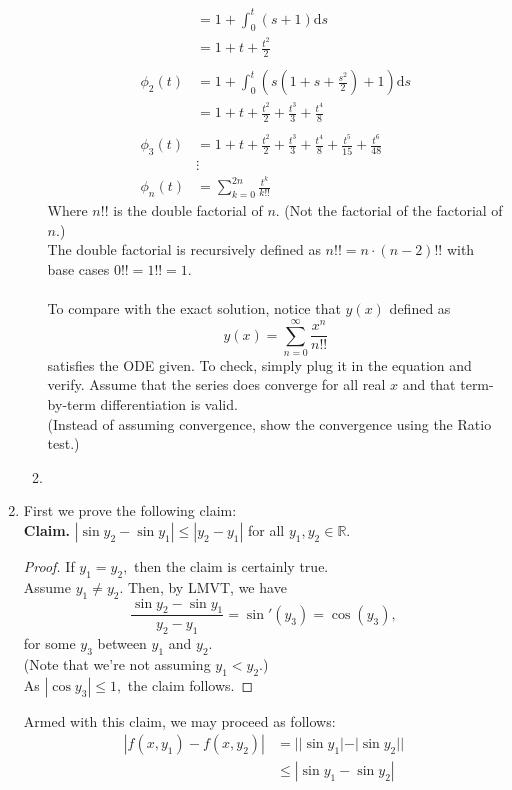 \documentclass{article}
\begin{document}
\begin{enumerate}[label = Q.\arabic*.]
\begin{enumerate}[label = (\roman*)]
\begin{align*}
			&= 1 + \int_{0}^{t} (s + 1) \text{d}s\\
			&= 1 + t + \frac{t^2}{2}\\~\\
			\phi_2(t) &= 1 + \int_{0}^{t} \left(s\left(1 + s + \frac{s^2}{2}\right) + 1\right) \text{d}s\\
			&= 1 + t + \frac{t^2}{2} + \frac{t^3}{3} + \frac{t^4}{8}\\~\\
			\phi_3(t) &= 1 + t + \frac{t^2}{2} + \frac{t^3}{3} + \frac{t^4}{8} + \frac{t^5}{15} + \frac{t^6}{48}\\
			&\vdots\\
			\phi_n(t) &= \sum_{k=0}^{2n}\frac{t^{k}}{k!!}
		\end{align*}
		Where $n!!$ is the double factorial of $n.$ (Not the factorial of the factorial of $n.$)\\
		The double factorial is recursively defined as $n!! = n\cdot(n - 2)!!$ with base cases $0!! = 1!! = 1.$\\~\\
		To compare with the exact solution, notice that $y(x)$ defined as
		\[y(x) = \sum_{n=0}^{\infty}\frac{x^n}{n!!}\]
		satisfies the ODE given. To check, simply plug it in the equation and verify. Assume that the series does converge for all real $x$ and that term-by-term differentiation is valid.\\
		(Instead of assuming convergence, show the convergence using the Ratio test.)
		\item %
	\end{enumerate}
	\item First we prove the following claim:\\
	\textbf{Claim.} $|\sin y_2 - \sin y_1| \le |y_2 - y_1|$ for all $y_1, y_2 \in \mathbb{R}.$
	\begin{proof} 
		If $y_1 = y_2,$ then the claim is certainly true.\\
		Assume $y_1 \neq y_2.$ Then, by LMVT, we have
		\[\frac{\sin y_2 - \sin y_1}{y_2 - y_1} = \sin'(y_3) = \cos(y_3),\]
		for some $y_3$ between $y_1$ and $y_2.$\\
		(Note that we're not assuming $y_1 < y_2.$)\\
		As $|\cos y_3| \le 1,$ the claim follows.
	\end{proof}
	Armed with this claim, we may proceed as follows:
	\begin{align*} 
		|f(x, y_1) - f(x, y_2)| &= ||\sin y_1| - |\sin y_2||\\
		&\le |\sin y_1 - \sin y_2|\\

\end{align*}
\end{enumerate}
\end{document}
